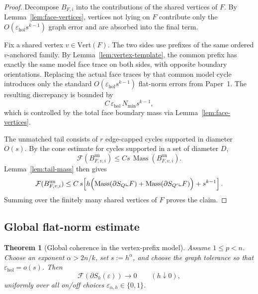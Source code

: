 \documentclass[11pt]{article}
\numberwithin{equation}{section}
\theoremstyle{plain}
\newtheorem{theorem}{Theorem}[section]
\theoremstyle{definition}
\theoremstyle{remark}
\DeclareMathOperator{\Mass}{Mass}
\newcommand{\eps}{\varepsilon}
\newcommand{\calF}{\mathcal{F}}
\begin{document}
\begin{proof}
Decompose $B_{F,i}$ into the contributions of the shared vertices of $F$.  By Lemma~\ref{lem:face-vertices}, vertices not lying on $F$ contribute only the $O(\eps_{\mathrm{hol}}s^{k-1})$ graph error and are absorbed into the final term.

Fix a shared vertex $v\in\mathrm{Vert}(F)$.  The two sides use prefixes of the same ordered $v$-anchored family.  By Lemma~\ref{lem:vertex-template}, the common prefix has exactly the same model face trace on both sides, with opposite boundary orientations.  Replacing the actual face traces by that common model cycle introduces only the standard $O(\eps_{\mathrm{hol}}s^{k-1})$ flat-norm errors from Paper~1.  The resulting discrepancy is bounded by
\[
C\,\eps_{\mathrm{hol}}\,N_{\min}s^{k-1},
\]
which is controlled by the total face boundary mass via Lemma~\ref{lem:face-vertices}.

The unmatched tail consists of $r$ edge-capped cycles supported in diameter $O(s)$.  By the cone estimate for cycles supported in a set of diameter $D$,
\[
\calF(B^{\mathrm{un}}_{F,v,i})\le C s\,\Mass(B^{\mathrm{un}}_{F,v,i}).
\]
Lemma~\ref{lem:tail-mass} then gives
\[
\calF(B^{\mathrm{un}}_{F,v,i})
\le
C\,s\!\left[
h\Bigl(\Mass(\partial S_Q\llcorner F)+\Mass(\partial S_{Q'}\llcorner F)\Bigr)+s^{k-1}
\right].
\]
Summing over the finitely many shared vertices of $F$ proves the claim.
\end{proof}

\subsection{Global flat-norm estimate}

\begin{theorem}[Global coherence in the vertex-prefix model]\label{thm:coherence}
Assume $1\le p<n$.  Choose an exponent $\alpha>2n/k$, set $s:=h^\alpha$, and choose the graph tolerance so that $\eps_{\mathrm{hol}}=o(s)$.  Then
\[
\calF(\partial S_h(\varepsilon))\longrightarrow 0
\qquad (h\downarrow 0),
\]
uniformly over all on/off choices $\varepsilon_{\alpha,h}\in\{0,1\}$.
\end{theorem}
\end{document}
